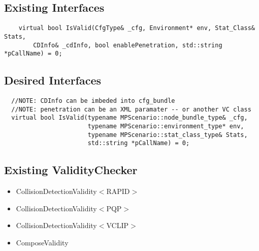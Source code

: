 \subsection{Existing Interfaces}
\begin{lstlisting}
    virtual bool IsValid(CfgType& _cfg, Environment* env, Stat_Class& Stats, 
	    CDInfo& _cdInfo, bool enablePenetration, std::string *pCallName) = 0;
\end{lstlisting}

\subsection{Desired Interfaces}
\begin{lstlisting}
  //NOTE: CDInfo can be imbeded into cfg_bundle
  //NOTE: penetration can be an XML paramater -- or another VC class
  virtual bool IsValid(typename MPScenario::node_bundle_type& _cfg, 
                       typename MPScenario::environment_type* env, 
                       typename MPScenario::stat_class_type& Stats, 
                       std::string *pCallName) = 0;
\end{lstlisting}

\subsection{Existing ValidityChecker}
\begin{itemize}
\item CollisionDetectionValidity$<$RAPID$>$
\item CollisionDetectionValidity$<$PQP$>$
\item CollisionDetectionValidity$<$VCLIP$>$
\item ComposeValidity
\end{itemize}